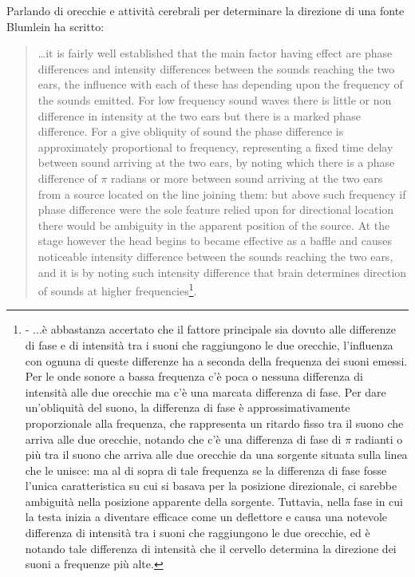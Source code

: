 Parlando di orecchie e attività cerebrali per determinare la direzione di una
fonte Blumlein ha scritto:

\begin{quote}
…it is fairly well established that the main factor having effect are phase
differences and intensity differences between the sounds reaching the two ears,
the influence with each of these has depending upon the frequency of the sounds
emitted. For low frequency sound waves there is little or non difference in
intensity at the two ears but there is a marked phase difference. For a give
obliquity of sound the phase difference is approximately proportional to
frequency, representing a fixed time delay between sound arriving at the two
ears, by noting which there is a phase difference of $\pi$ radians or more
between sound arriving at the two ears from a source located on the line joining
them: but above such frequency if phase difference were the sole feature relied
upon for directional location there would be ambiguity in the apparent position
of the source. At the stage however the head begins to became effective as a
baffle and causes noticeable intensity difference between the sounds reaching
the two ears, and it is by noting such intensity difference that brain
determines direction of sounds at higher frequencies\footnote{\cite{ab58} - ...è abbastanza
accertato che il fattore principale sia dovuto alle differenze di fase e di
intensità tra i suoni che raggiungono le due orecchie, l'influenza con ognuna di
queste differenze ha a seconda della frequenza dei suoni emessi. Per le onde
sonore a bassa frequenza c'è poca o nessuna differenza di intensità alle due
orecchie ma c'è una marcata differenza di fase. Per dare un'obliquità del suono,
la differenza di fase è approssimativamente proporzionale alla frequenza, che
rappresenta un ritardo fisso tra il suono che arriva alle due orecchie, notando
che c'è una differenza di fase di $\pi$ radianti o più tra il suono che arriva
alle due orecchie da una sorgente situata sulla linea che le unisce: ma al di
sopra di tale frequenza se la differenza di fase fosse l'unica caratteristica
su cui si basava per la posizione direzionale, ci sarebbe ambiguità nella
posizione apparente della sorgente. Tuttavia, nella fase in cui la testa inizia
a diventare efficace come un deflettore e causa una notevole differenza di
intensità tra i suoni che raggiungono le due orecchie, ed è notando tale
differenza di intensità che il cervello determina la direzione dei suoni a
frequenze più alte.}.
\end{quote}

